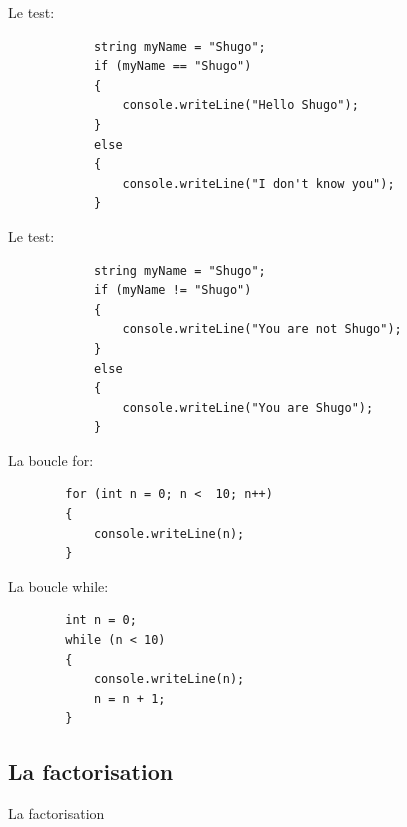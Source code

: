 \documentclass{beamer}
\begin{document}
\begin{frame}[fragile]
Le test:
		\begin{lstlisting}
			string myName = "Shugo";
			if (myName == "Shugo")
			{
 				console.writeLine("Hello Shugo");
			}
			else
			{
 				console.writeLine("I don't know you");
			}
		\end{lstlisting}

\end{frame}

\begin{frame}[fragile]
Le test:
		\begin{lstlisting}
			string myName = "Shugo";
			if (myName != "Shugo")
			{
 				console.writeLine("You are not Shugo");
			}
			else
			{
 				console.writeLine("You are Shugo");
			}
		\end{lstlisting}

\end{frame}

\begin{frame}[fragile]
La boucle for:
		\begin{lstlisting}
		for (int n = 0; n <  10; n++)
		{
 			console.writeLine(n);
		}
		\end{lstlisting}
\end{frame}

\begin{frame}[fragile]
La boucle while:
		\begin{lstlisting}
		int n = 0;
		while (n < 10)
		{
 			console.writeLine(n);
 			n = n + 1;
		}
		\end{lstlisting}
\end{frame}

\subsection{La factorisation}
\begin{frame}[fragile]
    \begin{center}
        \huge{La factorisation}
    \end{center}
\end{frame}

\begin{frame}[fragile]
        
\end{frame}

\begin{frame}[fragile]
        
\end{frame}
\end{document}
